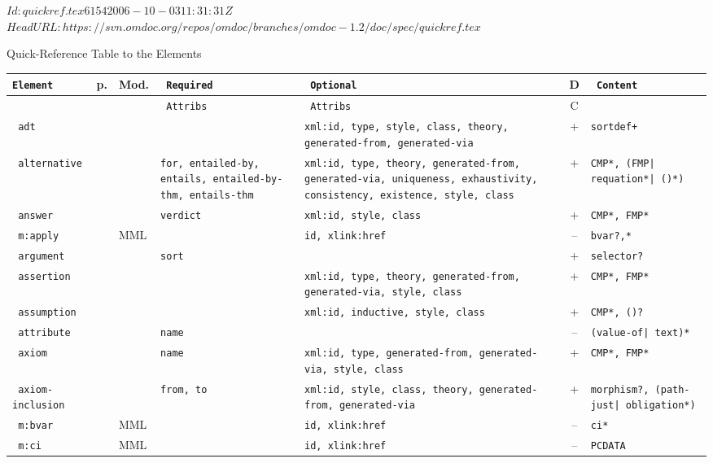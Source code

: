 \svnInfo $Id: quickref.tex 6154 2006-10-03 11:31:31Z  $
\svnKeyword $HeadURL: https://svn.omdoc.org/repos/omdoc/branches/omdoc-1.2/doc/spec/quickref.tex $

\begin{tchapter}[id=table,short=Quick-Reference]{Quick-Reference Table to the {\omdoc} Elements}
\def\tabelt#1#2#3#4#5#6{{#1}&\pageref{eldef:#1}&{#2}&{#3}&{#4}&{#5}&{#6}\\\hline}
\def\mathmlcat{MML}\def\omcat{OM}
 {\scriptsize\begin{longtable}{|>{\tt}p{1.8cm}|l|l|>{\tt}p{1.8cm}|>{\tt}p{1.8cm}|c|>{\tt}p{2.2cm}|}\hline
{\rm Element}& p. & Mod.  & {\rm Required}  & {\rm Optional} & D & Content \\\hline
             & &        & {\rm Attribs}  & {\rm Attribs} & C &        \\\hline\hline
\tabelt{adt}{\ADTmodule{spec}}{}{xml:id, type, style, class, theory, generated-from, generated-via}{+}{sortdef+}
\tabelt{alternative}{\STmodule{spec}}{for, entailed-by, entails,
             entailed-by-thm, entails-thm}{xml:id, type, theory,
  generated-from, generated-via, uniqueness, exhaustivity, consistency, existence,
             style, class}{+}{CMP*, (FMP| requation*| ({\mobjabbr})*)}
\tabelt{answer}{\QUIZmodule{spec}}{verdict}{xml:id, style, class}{+}{CMP*, FMP*}
\tabelt{m:apply}\mathmlcat{}{id, xlink:href}{--}{bvar?,\llquote{CMel}*}
\tabelt{argument}{\ADTmodule{spec}}{sort}{}{+}{selector?}
\tabelt{assertion}{\STmodule{spec}}{}{xml:id, type, theory,
  generated-from, generated-via, style, class}{+}{CMP*, FMP*}
\tabelt{assumption}{\MTXTmodule{spec}}{}{xml:id, inductive, style, class}{+}{CMP*, (\mobjabbr)?}
\tabelt{attribute}{\PRESmodule{spec}}{name}{}{--}{(value-of| text)*}
\tabelt{axiom}{\STmodule{spec}}{name}{xml:id, type, generated-from, generated-via, style, class}{+}{CMP*, FMP*}
\tabelt{axiom-inclusion}{\CTHmodule{spec}}{from, to}{xml:id, style, class, theory,
  generated-from, generated-via}{+}{morphism?, (path-just| obligation*)}\hline
\tabelt{m:bvar}\mathmlcat{}{id, xlink:href}{--}{ci*}
\tabelt{m:ci}\mathmlcat{}{id, xlink:href}{--}{PCDATA}

\end{longtable}}
\end{tchapter}
